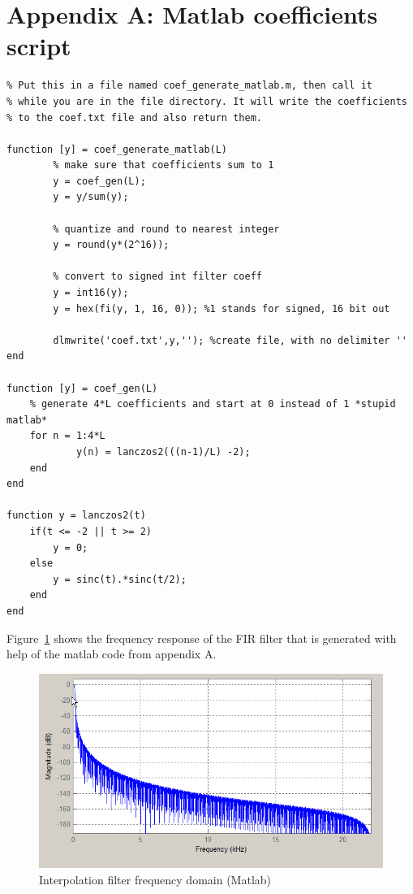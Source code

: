\documentclass[a4paper,twoside,11pt, fleqn]{article}
\begin{document}
\section{Appendix A: Matlab coefficients script}
\begin{lstlisting}
% Put this in a file named coef_generate_matlab.m, then call it 
% while you are in the file directory. It will write the coefficients
% to the coef.txt file and also return them.

function [y] = coef_generate_matlab(L)
        % make sure that coefficients sum to 1
        y = coef_gen(L);
        y = y/sum(y);

        % quantize and round to nearest integer
        y = round(y*(2^16)); 
             
        % convert to signed int filter coeff
        y = int16(y);
        y = hex(fi(y, 1, 16, 0)); %1 stands for signed, 16 bit out
        
        dlmwrite('coef.txt',y,''); %create file, with no delimiter ''      
end

function [y] = coef_gen(L)
    % generate 4*L coefficients and start at 0 instead of 1 *stupid matlab*
    for n = 1:4*L
            y(n) = lanczos2(((n-1)/L) -2);
    end
end

function y = lanczos2(t)
    if(t <= -2 || t >= 2)
        y = 0;
    else
        y = sinc(t).*sinc(t/2);
    end
end
\end{lstlisting}

Figure~\ref{fig:frq} shows the frequency response of the FIR filter that is generated with help of the matlab code from appendix A.

\begin{figure}[h]
	\includegraphics[scale=0.7]{Images/frequencyplot}
    \caption{Interpolation filter frequency domain (Matlab)}
    \label{fig:frq}
\end{figure}
\end{document}
